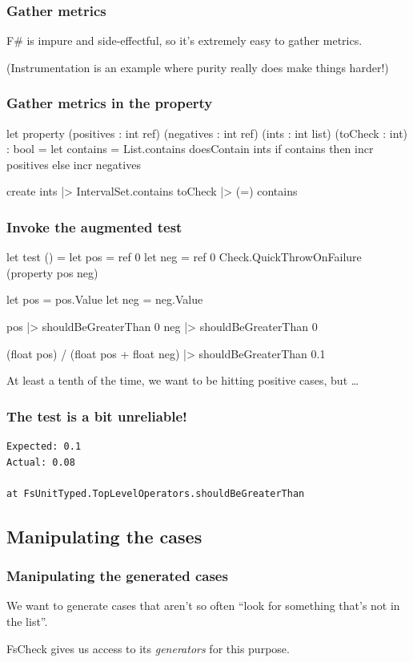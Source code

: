 \documentclass{beamer}
\begin{document}
\begin{frame}
\frametitle{Gather metrics}
F\# is impure and side-effectful, so it's extremely easy to gather metrics.

\hfill \break

(Instrumentation is an example where purity really does make things harder!)
\end{frame}

\begin{frame}[fragile]
\frametitle{Gather metrics in the property}
\begin{fslisting}
let property
    (positives : int ref) (negatives : int ref)
    (ints : int list)
    (toCheck : int)
    : bool
    =
    let contains = List.contains doesContain ints
    if contains then
        incr positives
    else
        incr negatives

    create ints
    |> IntervalSet.contains toCheck
    |> (=) contains
\end{fslisting}
\end{frame}

\begin{frame}[fragile]
\frametitle{Invoke the augmented test}
\begin{fslisting}
[<Test>]
let test () =
    let pos = ref 0
    let neg = ref 0
    Check.QuickThrowOnFailure (property pos neg)

    let pos = pos.Value
    let neg = neg.Value

    pos |> shouldBeGreaterThan 0
    neg |> shouldBeGreaterThan 0

    (float pos) / (float pos + float neg)
    |> shouldBeGreaterThan 0.1
\end{fslisting}
\end{frame}

\begin{frame}
At least a tenth of the time, we want to be hitting positive cases, but \dots
\end{frame}

\begin{frame}[fragile]
\frametitle{The test is a bit unreliable!}
\begin{verbatim}
Expected: 0.1
Actual: 0.08

at FsUnitTyped.TopLevelOperators.shouldBeGreaterThan
\end{verbatim}
\end{frame}

\subsection{Manipulating the cases}
\begin{frame}
\frametitle{Manipulating the generated cases}
We want to generate cases that aren't so often ``look for something that's not in the list''.

FsCheck gives us access to its \emph{generators} for this purpose.
\end{frame}
\end{document}
